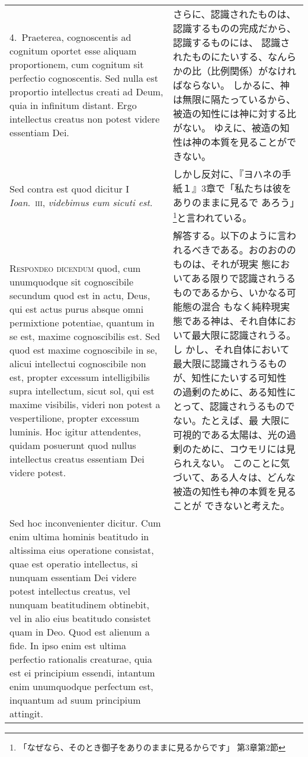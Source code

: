 \documentclass[10pt]{jsarticle} %
\begin{document}
\begin{longtable}{p{21em}p{21em}}
\\

4.~{\sc Praeterea}, cognoscentis ad cognitum oportet esse aliquam
proportionem, cum cognitum sit perfectio cognoscentis. Sed nulla est
proportio intellectus creati ad Deum, quia in infinitum distant. Ergo
intellectus creatus non potest videre essentiam Dei.

&

さらに、認識されたものは、認識するものの完成だから、認識するものには、
認識されたものにたいする、なんらかの比（比例関係）がなければならない。
しかるに、神は無限に隔たっているから、被造の知性には神に対する比がない。
ゆえに、被造の知性は神の本質を見ることができない。

\\

{\sc Sed contra est} quod dicitur I {\itshape Ioan}.~{\scshape iii},
{\it videbimus eum sicuti est}.

&

しかし反対に、『ヨハネの手紙１』3章で「私たちは彼をありのままに見るで
あろう」\footnote{「なぜなら、そのとき御子をありのままに見るからです」
第3章第2節}と言われている。

\\

{\scshape Respondeo dicendum} quod, cum unumquodque sit cognoscibile
secundum quod est in actu, Deus, qui est actus purus absque omni
permixtione potentiae, quantum in se est, maxime cognoscibilis
est. Sed quod est maxime cognoscibile in se, alicui intellectui
cognoscibile non est, propter excessum intelligibilis supra
intellectum, sicut sol, qui est maxime visibilis, videri non potest a
vespertilione, propter excessum luminis. Hoc igitur attendentes,
quidam posuerunt quod nullus intellectus creatus essentiam Dei videre
potest.

&

解答する。以下のように言われるべきである。おのおののものは、それが現実
態においてある限りで認識されうるものであるから、いかなる可能態の混合
もなく純粋現実態である神は、それ自体において最大限に認識されうる。し
かし、それ自体において最大限に認識されうるものが、知性にたいする可知性
の過剰のために、ある知性にとって、認識されうるものでない。たとえば、最
大限に可視的である太陽は、光の過剰のために、コウモリには見られえない。
このことに気づいて、ある人々は、どんな被造の知性も神の本質を見ることが
できないと考えた。

\\

Sed hoc inconvenienter dicitur. Cum enim ultima hominis beatitudo in
altissima eius operatione consistat, quae est operatio intellectus, si
nunquam essentiam Dei videre potest intellectus creatus, vel nunquam
beatitudinem obtinebit, vel in alio eius beatitudo consistet quam in
Deo. Quod est alienum a fide.  In ipso enim est ultima perfectio
rationalis creaturae, quia est ei principium essendi, intantum enim
unumquodque perfectum est, inquantum ad suum principium attingit.


\end{longtable}
\end{document}
